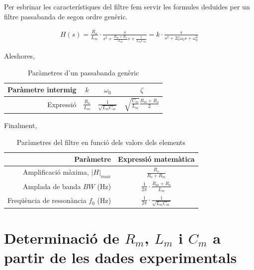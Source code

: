 \documentclass[catalan, a4paper, nobib]{tufte-handout}
\begin{document}
 Per esbrinar les característiques del filtre fem servir les formules deduides per un filtre passabanda de segon ordre genèric.

\begin{gather*}
  H(s) = \frac{R_o}{L_m} \cdot \frac{s}{s^2 + \frac{R_m + R_o}{L_m} s + \frac{1}{L_m C_m}} = k \cdot \frac{s}{s^2 + 2 \zeta \omega_0 s + \omega_0^2}
\end{gather*}

\newthought{} Aleshores,

\begin{table}
  \begin{center}
    \begin{tabular}{@{}rccc@{}}
      \toprule
      Paràmetre intermig & $k$ & $\omega_0$ & $\zeta$ \\
      \midrule
      Expressió & $\frac{R_o}{L_m}$ & $\frac{1}{\sqrt{L_m C_m}}$ & $\sqrt{\frac{C_m}{L_m}} \frac{R_m + R_o}{2}$ \\
      \bottomrule
    \end{tabular}
  \end{center}
  \caption{Paràmetres d'un passabanda genèric}
\end{table}

\newthought{} Finalment,

\renewcommand{\arraystretch}{1.5}
\begin{table}
  \begin{center}
    \begin{tabular}{@{}rc@{}}
      \toprule
      Paràmetre & Expressió matemàtica \\
      \midrule
      Amplificació màxima, $|H|_{max}$
      &
      $\frac{R_o}{R_o + R_m}$
      \\
      Amplada de banda $BW$ (\unit{\hertz})
      &
      $\frac{1}{2\pi} \cdot \frac{R_m + R_o}{L_m}$
      \\
      Freqüència de ressonància $f_0$ (\unit{\hertz})
      &
      $\frac{1}{2 \pi} \cdot \frac{1}{\sqrt{L_m C_m}}$
      \\
      \bottomrule
    \end{tabular}
  \end{center}
  \caption{Paràmetres del filtre en funció dels valors dels elements}
\end{table}
\renewcommand{\arraystretch}{1}

\section{Determinació de $R_m$, $L_m$ i $C_m$ a partir de les dades experimentals}
\end{document}
